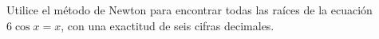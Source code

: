 \item Utilice el método de Newton para encontrar todas las raíces de la ecuación $6 \cos x = x$, con una exactitud de seis cifras decimales.
